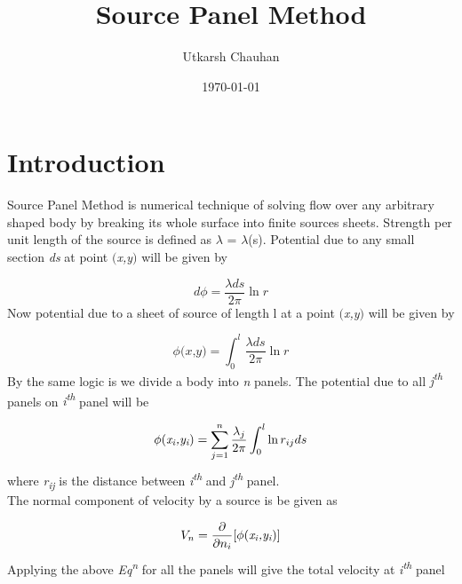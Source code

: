 \documentclass[a4paper]{article}
\title{\bf{Source Panel Method}}
\author{Utkarsh Chauhan}
\date{\today}
\begin{document}
\maketitle

\section{Introduction}
\label{sec:introduction}

Source Panel Method is numerical technique of solving flow over any arbitrary shaped body by breaking its whole surface into finite sources sheets. Strength per unit length of the source is defined as {$\lambda$ = $\lambda$(s)}. Potential due to any small section \textit{ds} at point \textit{$($x,y$)$} will be given by

\begin{equation*}
    d\phi = \frac{\lambda ds}{2 \pi}\ln r
\end{equation*}
\newline
Now potential due to a sheet of source of length l at a point \textit{$($x,y$)$} will be given by

\begin{equation*}
    \phi \textit{$($x,y$)$} = \int_0^l\frac{\lambda ds}{2 \pi}\ln r
\end{equation*}
\newline
By the same logic is we divide a body into \textit{n} panels. The potential due to all \textit{j\textsuperscript{th}} panels on \textit{i\textsuperscript{th}} panel will be 

\begin{equation*}
    \phi \textit{$($x\textsubscript{i},y\textsubscript{i}$)$} = \sum_{j=1}^{n} \frac{\lambda_j}{2 \pi} \int_0^l\ln r_{ij} ds
\end{equation*}
\newline
where \textit{r\textsubscript{ij}} is the distance between \textit{i\textsuperscript{th}} and \textit{j\textsuperscript{th}} panel.\\
\newline
The normal component of velocity by a source is be given as 

\begin{equation*}
V_n = \frac{\partial }{\partial n_i}[\phi \textit{$($x\textsubscript{i},y\textsubscript{i}$)$}]
\end{equation*}
\newline
Applying the above \textit{Eq\textsuperscript{n}} for all the panels will give the total velocity at \textit{i\textsuperscript{th}} panel 
\end{document}
